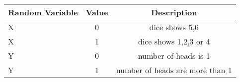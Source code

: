 \begin{tabular}{|l|c|c|}
	
	\hline
	Random Variable  & Value & Description   \\
	\hline
	X & 0 & dice shows 5,6 \\
	\hline
	X & 1 & dice shows 1,2,3 or 4 \\
	\hline
	Y & 0 & number of heads is 1 \\
	\hline
	Y & 1 & number of heads are more than 1 \\
	\hline
\end{tabular}
